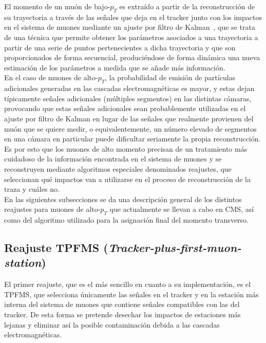 
El momento de un mu\'on de bajo-$p_{T}$ es extra\'ido a partir de la reconstrucci\'on de su trayectoria a trav\'es de las se\~nales que deja en el tracker junto con los impactos en el sistema de muones mediante un ajuste por filtro de Kalman~\cite{Kalman1960ANA}, que se trata de una t\'ecnica que permite obtener los par\'ametros asociados a una trayectoria a partir de una serie de puntos pertenecientes a dicha trayectoria y que son proporcionados de forma secuencial, produci\'endose de forma din\'amica una nueva estimaci\'on de los par\'ametros a medida que se a\~nade m\'as informaci\'on. \\

En el caso de muones de alto-$p_{T}$, la probabilidad de emisi\'on de part\'iculas adicionales generadas en las cascadas electromagn\'eticas es mayor, y estas dejan t\'ipicamente se\~nales adicionales (m\'ultiples segmentos) en las distintas c\'amaras, provocando que estas se\~nales adicionales sean probablemente utilizadas en el ajuste por filtro de Kalman en lugar de las se\~nales que realmente provienen del mu\'on que se quiere medir, o equivalentemente, un n\'umero elevado de segmentos en una c\'amara en particular puede dificultar seriamente la propia reconstrucci\'on. Es por esto que los muones de alto momento precisan de un tratamiento m\'as cuidadoso de la informaci\'on encontrada en el sistema de muones y se reconstruyen mediante algoritmos especiales denominados reajustes, que seleccionan qu\'e impactos van a utilizarse en el proceso de reconstrucci\'on de la traza y cu\'ales no. \\

En las siguientes subsecciones se da una descripci\'on general de los distintos reajustes para muones de alto-$p_{T}$ que actualmente se llevan a cabo en CMS, as\'i como del algoritmo utilizado para la asignaci\'on final del momento transverso.

\subsection{Reajuste TPFMS (\textit{Tracker-plus-first-muon-station})}\label{sec:TPFMS}

El primer reajuste, que es el m\'as sencillo en cuanto a su implementaci\'on, es el TPFMS, que selecciona \'unicamente las se\~nales en el tracker y en la estaci\'on m\'as interna del sistema de muones que contiene se\~nales compatibles con las del tracker. De esta forma se pretende desechar los impactos de estaciones m\'as lejanas y eliminar as\'i la posible contaminaci\'on debida a las cascadas electromagn\'eticas.

